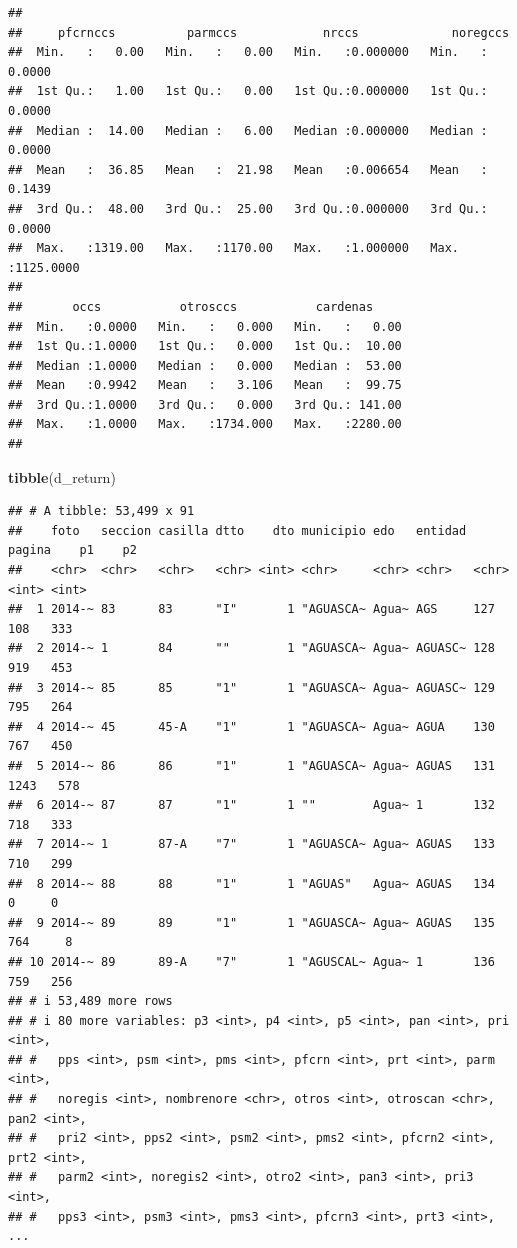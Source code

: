 \documentclass[
]{article}
\newenvironment{Shaded}{\begin{snugshade}}{\end{snugshade}}
\newcommand{\FunctionTok}[1]{\textcolor[rgb]{0.13,0.29,0.53}{\textbf{#1}}}
\newcommand{\NormalTok}[1]{#1}
\begin{document}
\begin{verbatim}
##                                                                      
##     pfcrnccs          parmccs            nrccs             noregccs        
##  Min.   :   0.00   Min.   :   0.00   Min.   :0.000000   Min.   :   0.0000  
##  1st Qu.:   1.00   1st Qu.:   0.00   1st Qu.:0.000000   1st Qu.:   0.0000  
##  Median :  14.00   Median :   6.00   Median :0.000000   Median :   0.0000  
##  Mean   :  36.85   Mean   :  21.98   Mean   :0.006654   Mean   :   0.1439  
##  3rd Qu.:  48.00   3rd Qu.:  25.00   3rd Qu.:0.000000   3rd Qu.:   0.0000  
##  Max.   :1319.00   Max.   :1170.00   Max.   :1.000000   Max.   :1125.0000  
##                                                                            
##       occs           otrosccs           cardenas      
##  Min.   :0.0000   Min.   :   0.000   Min.   :   0.00  
##  1st Qu.:1.0000   1st Qu.:   0.000   1st Qu.:  10.00  
##  Median :1.0000   Median :   0.000   Median :  53.00  
##  Mean   :0.9942   Mean   :   3.106   Mean   :  99.75  
##  3rd Qu.:1.0000   3rd Qu.:   0.000   3rd Qu.: 141.00  
##  Max.   :1.0000   Max.   :1734.000   Max.   :2280.00  
## 
\end{verbatim}

\begin{Shaded}
\begin{Highlighting}[]
\FunctionTok{tibble}\NormalTok{(d\_return)}
\end{Highlighting}
\end{Shaded}

\begin{verbatim}
## # A tibble: 53,499 x 91
##    foto   seccion casilla dtto    dto municipio edo   entidad pagina    p1    p2
##    <chr>  <chr>   <chr>   <chr> <int> <chr>     <chr> <chr>   <chr>  <int> <int>
##  1 2014-~ 83      83      "I"       1 "AGUASCA~ Agua~ AGS     127      108   333
##  2 2014-~ 1       84      ""        1 "AGUASCA~ Agua~ AGUASC~ 128      919   453
##  3 2014-~ 85      85      "1"       1 "AGUASCA~ Agua~ AGUASC~ 129      795   264
##  4 2014-~ 45      45-A    "1"       1 "AGUASCA~ Agua~ AGUA    130      767   450
##  5 2014-~ 86      86      "1"       1 "AGUASCA~ Agua~ AGUAS   131     1243   578
##  6 2014-~ 87      87      "1"       1 ""        Agua~ 1       132      718   333
##  7 2014-~ 1       87-A    "7"       1 "AGUASCA~ Agua~ AGUAS   133      710   299
##  8 2014-~ 88      88      "1"       1 "AGUAS"   Agua~ AGUAS   134        0     0
##  9 2014-~ 89      89      "1"       1 "AGUASCA~ Agua~ AGUAS   135      764     8
## 10 2014-~ 89      89-A    "7"       1 "AGUSCAL~ Agua~ 1       136      759   256
## # i 53,489 more rows
## # i 80 more variables: p3 <int>, p4 <int>, p5 <int>, pan <int>, pri <int>,
## #   pps <int>, psm <int>, pms <int>, pfcrn <int>, prt <int>, parm <int>,
## #   noregis <int>, nombrenore <chr>, otros <int>, otroscan <chr>, pan2 <int>,
## #   pri2 <int>, pps2 <int>, psm2 <int>, pms2 <int>, pfcrn2 <int>, prt2 <int>,
## #   parm2 <int>, noregis2 <int>, otro2 <int>, pan3 <int>, pri3 <int>,
## #   pps3 <int>, psm3 <int>, pms3 <int>, pfcrn3 <int>, prt3 <int>, ...
\end{verbatim}
\end{document}
